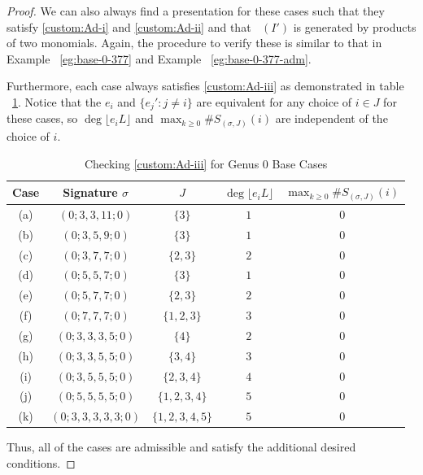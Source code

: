 \documentclass{amsart}
\theoremstyle{plain}
\theoremstyle{definition}
\theoremstyle{remark}
\numberwithin{equation}{section}
\newcommand{\halfcan}{L}
\DeclareMathOperator{\initial}{in_\prec}
\begin{document}
\begin{proof}
We can also always find a presentation for these cases such that
they satisfy \ref{custom:Ad-i} and \ref{custom:Ad-ii} and that $\initial(I')$ is
generated by products of two monomials. Again, the procedure to
verify these is similar to that in Example
~\ref{eg:base-0-377} and Example ~\ref{eg:base-0-377-adm}.

Furthermore, each case always satisfies \ref{custom:Ad-iii} as demonstrated in table ~\ref{table:g-0-base-cases-admissibility}.
Notice that the $e_i$ and $\{e_j' : j \neq i\}$ are equivalent
for any choice of $i \in J$ for these cases, so $\deg \lfloor e_i \halfcan
\rfloor$ and $\max_{k \geq 0} \#S_{(\sigma, J)}(i)$ are
independent of the choice of $i$.

\begin{table}
\begin{tabular}
	{| c | c | c || c | c |}
	\hline
	Case & Signature $\sigma$ & $J$ & $\deg \lfloor e_i L \rfloor$ &
	$\max_{k \geq 0} \#S_{(\sigma, J)}(i)$ \\
	\hline
	\hline

	(a) & $(0; 3, 3, 11; 0)$ & $\{3\}$ & $1$ & $0$ \\	\hline
	
	(b) & $(0; 3, 5, 9; 0)$ & $\{3\}$ & $1$ & $0$ \\ \hline
	
	(c) & $(0; 3, 7, 7; 0)$ & $\{2, 3\}$ & $2$ & $0$ \\ \hline
	
	(d) & $(0; 5, 5, 7; 0)$ & $\{3\}$ & $1$ & $0$ \\ \hline
	
	(e) & $(0; 5, 7, 7; 0)$ & $\{2, 3\}$ & $2$ & $0$ \\ \hline

	(f) & $(0; 7, 7, 7; 0)$ & $\{1, 2, 3\}$ & $3$ & $0$ \\ \hline

	(g) & $(0; 3, 3, 3, 5; 0)$ & $\{4\}$ & $2$ & $0$ \\ \hline
	
	(h) & $(0; 3, 3, 5, 5; 0)$ & $\{3, 4\}$ & $3$ & $0$ \\ \hline
	
	(i) & $(0; 3, 5, 5, 5; 0)$ & $\{2, 3, 4\}$ & $4$ & $0$ \\ \hline
	
	(j) & $(0; 5, 5, 5, 5; 0)$ & $\{1, 2, 3, 4\}$ & $5$ & $0$ \\ \hline

	(k) & $(0; 3, 3, 3, 3, 3; 0)$ & $\{1, 2, 3, 4, 5\}$ & $5$ & $0$ \\ \hline
\end{tabular}	

\caption{Checking \ref{custom:Ad-iii} for Genus 0 Base Cases}
\label{table:g-0-base-cases-admissibility}
\end{table}

Thus, all of the cases are admissible and satisfy the additional
desired conditions.
\end{proof}
\end{document}
